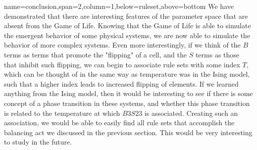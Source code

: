 \documentclass[a0paper,portrait]{baposter}
\begin{document}
\begin{poster}
{name=conclusion,span=2,column=1,below=ruleset,above=bottom}{
	We have demonstrated that there are interesting features of the parameter space that are absent from the Game of Life. Knowing that the Game of Life is able to simulate the emergent behavior of some physical systems, we are now able to simulate the behavior of more complex systems. Even more interestingly, if we think of the $B$ terms as terms that promote the "flipping" of a cell, and the $S$ terms as those that inhibit such flipping, we can begin to associate rule sets with some index $T$, which can be thought of in the same way as temperature was in the Ising model, such that a higher index leads to increased flipping of elements. If we learned anything from the Ising model, then it would be interesting to see if there is some concept of a phase transition in these systems, and whether this phase transition is related to the temperature at which $B3S23$ is associated. Creating such an association, we would be able to easily find all rule sets that accomplish the balancing act we discussed in the previous section. This would be very interesting to study in the future.
}

\end{poster}
\end{document}
